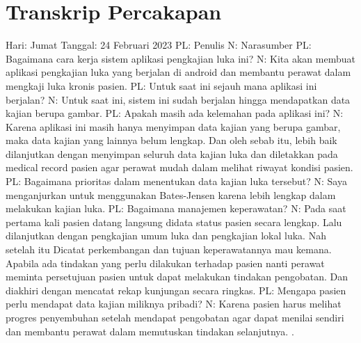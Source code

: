 \appendix 
\chapter{Transkrip Percakapan}
\begin{flushleft}
Hari: Jumat
\linebreak
Tanggal: 24 Februari 2023
\linebreak
PL: Penulis
\linebreak
N: Narasumber
\linebreak
\linebreak
PL: Bagaimana cara kerja sistem aplikasi pengkajian luka ini?
\linebreak
N: Kita akan membuat aplikasi pengkajian luka yang berjalan di android dan membantu perawat dalam mengkaji luka kronis pasien.
\linebreak
PL: Untuk saat ini sejauh mana aplikasi ini berjalan?
\linebreak
N: Untuk saat ini, sistem ini sudah berjalan hingga mendapatkan data kajian berupa gambar.
\linebreak
PL: Apakah masih ada kelemahan pada aplikasi ini?
\linebreak
N: Karena aplikasi ini masih hanya menyimpan data kajian yang berupa gambar, maka data kajian yang lainnya belum lengkap. Dan oleh sebab itu, lebih baik dilanjutkan dengan menyimpan seluruh data kajian luka dan diletakkan pada medical record pasien agar perawat mudah dalam melihat riwayat kondisi pasien.
\linebreak
PL: Bagaimana prioritas dalam menentukan data kajian luka tersebut?
\linebreak
N: Saya menganjurkan untuk menggunakan Bates-Jensen karena lebih lengkap dalam melakukan kajian luka.
\linebreak
PL: Bagaimana manajemen keperawatan?
\linebreak
N: Pada saat pertama kali pasien datang langsung didata status pasien secara lengkap. Lalu dilanjutkan dengan pengkajian umum luka dan pengkajian lokal luka. Nah setelah itu Dicatat perkembangan dan tujuan keperawatannya mau kemana. Apabila ada tindakan yang perlu dilakukan terhadap pasien nanti perawat meminta persetujuan pasien untuk dapat melakukan tindakan pengobatan. Dan diakhiri dengan mencatat rekap kunjungan secara ringkas.
\linebreak
PL: Mengapa pasien perlu mendapat data kajian miliknya pribadi?
\linebreak
N: Karena pasien harus melihat progres penyembuhan setelah mendapat pengobatan agar dapat menilai sendiri dan membantu perawat dalam memutuskan tindakan selanjutnya.
\linebreak.
\end{flushleft}


